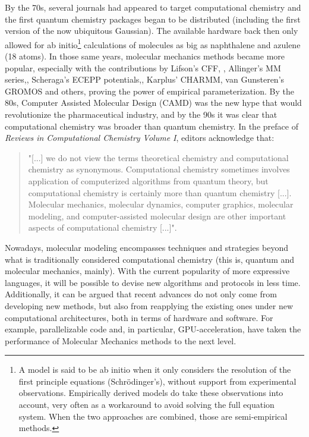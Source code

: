 By the 70s, several journals had appeared to target computational chemistry and the first quantum chemistry packages began to be distributed (including the first version of the now ubiquitous Gaussian\cite{gaussian}). The available hardware back then only allowed for ab initio\footnote{ A model is said to be ab initio when it only considers the resolution of the first principle equations (Schrödinger’s), without support from experimental observations. Empirically derived models do take these observations into account, very often as a workaround to avoid solving the full equation system. When the two approaches are combined, those are semi-empirical methods.  } calculations of molecules as big as naphthalene and azulene (18 atoms). In those same years, molecular mechanics methods became more popular, especially with the contributions by Lifson’s CFF, \cite{lifson1968consistent,hagler1974energy,niketic1977lecture}, Allinger’s MM series,\cite{allinger1973,allinger1977}, Scheraga’s ECEPP potentials,\cite{momany1975energy,nemethy1983energy}, Karplus’ CHARMM,\cite{brooks1983} van Gunsteren’s GROMOS\cite{van1987groningen} and others, proving the power of empirical parameterization. By the 80s, Computer Assisted Molecular Design (CAMD) was the new hype that would revolutionize the pharmaceutical industry,\cite{fortune1981} and by the 90s it was clear that computational chemistry was broader than quantum chemistry. In the preface of \textit{Reviews in Computational Chemistry Volume I},\cite{lipkovitz1990} editors acknowledge that:

\begin{quote}
	"[...] we do not view the terms theoretical chemistry and computational chemistry as synonymous. Computational chemistry sometimes involves application of computerized algorithms from quantum theory, but computational chemistry is certainly more than quantum chemistry [...]. Molecular mechanics, molecular dynamics, computer graphics, molecular modeling, and computer-assisted molecular design are other important aspects of computational chemistry [...]".
\end{quote}

Nowadays, molecular modeling encompasses techniques and strategies beyond what is traditionally considered computational chemistry (this is, quantum and molecular mechanics, mainly). With the current popularity of more expressive languages, it will be possible to devise new algorithms and protocols in less time. Additionally, it can be argued that recent advances do not only come from developing new methods, but also from reapplying the existing ones under new computational architectures, both in terms of hardware and software. For example, parallelizable code and, in particular, GPU-acceleration, have taken the performance of Molecular Mechanics methods to the next level.

